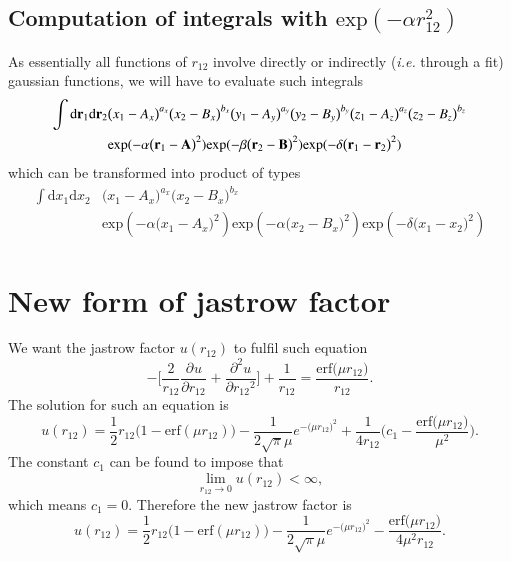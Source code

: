 \documentclass[aip,jcp,reprint,noshowkeys,superscriptaddress]{revtex4-1}
\newcommand{\deriv}[3]{\frac{\partial^{#3} #1}{\partial {#2}^{#3}}}
\newcommand{\br}[0]{{\bf {r}}}
\begin{document}
\subsection{Computation of integrals with $\text{exp}(-\alpha r_{12}^2)$}
As essentially all functions of $r_{12}$ involve directly or indirectly (\textit{i.e.} through a fit) gaussian functions, we will have to evaluate such integrals
\begin{equation}
 \begin{aligned}
  \int \text{d}\br{}_1  \text{d}\br{}_2& \big( x_1 - A_x \big)^{a_x}  \big( x_2 - B_x \big)^{b_x} 
                                         \big( y_1 - A_y \big)^{a_y}  \big( y_2 - B_y \big)^{b_y} 
                                         \big( z_1 - A_z \big)^{a_z}  \big( z_2 - B_z \big)^{b_z} \\
                                       & \text{exp}(-\alpha \big(\br{}_1 - {\bf A} \big)^2)
                                         \text{exp}(-\beta  \big(\br{}_2 - {\bf B} \big)^2)
                                         \text{exp}(-\delta \big(\br{}_1 - \br{}_2 \big)^2)
 \end{aligned}
\end{equation}
which can be transformed into product of types 
\begin{equation}
 \begin{aligned}
  \int \text{d}x_1 \text{d}x_2 & \big( x_1 - A_x \big)^{a_x} \big( x_2 - B_x \big)^{b_x} \\ 
  & \text{exp}(-\alpha \big(x_1 - A_x \big)^2) \text{exp}(-\alpha \big(x_2 - B_x \big)^2) \text{exp}(-\delta \big(x_1 - x_2 \big)^2)
 \end{aligned}
\end{equation}

\section{New form of jastrow factor}
We want the jastrow factor $u(r_{12})$ to fulfil such equation
\begin{equation}
 - \bigg[ \frac{2}{r_{12}} \deriv{u}{r_{12}}{}  + \deriv{u}{r_{12}}{2} \bigg] + \frac{1}{r_{12}} = \frac{\text{erf}\big( \mu r_{12} \big)}{r_{12}}.
\end{equation}
The solution for such an equation is 
\begin{equation}
 u(r_{12}) = \frac{1}{2}r_{12}\bigg( 1 - \text{erf}(\mu r_{12}) \bigg) - \frac{1}{2\sqrt{\pi} \mu} e^{-\big( \mu r_{12}\big)^2} + \frac{1}{4 r_{12}} \bigg(c_1 - \frac{\text{erf}\big(\mu r_{12} \big)}{\mu^2} \bigg).
\end{equation}
The constant $c_1$ can be found to impose that 
\begin{equation}
 \lim_{r_{12} \rightarrow 0 } u(r_{12}) < \infty,
\end{equation}
which means $c_1 = 0$. Therefore the new jastrow factor is 
\begin{equation}
 u(r_{12}) = \frac{1}{2}r_{12}\bigg( 1 - \text{erf}(\mu r_{12}) \bigg) - \frac{1}{2\sqrt{\pi} \mu} e^{-\big( \mu r_{12}\big)^2}  - \frac{\text{erf}\big(\mu r_{12} \big)}{4 \mu^2 r_{12}}.
\end{equation}
\end{document}
